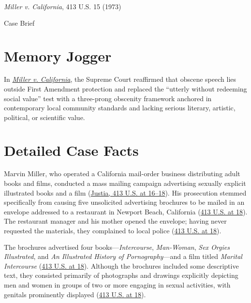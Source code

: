 \documentclass[12pt]{article}
\begin{document}
\begin{center}
{\LARGE \textit{Miller v. California}, 413 U.S. 15 (1973)\par}
\vspace{0.8em}
{\large Case Brief\par}
\end{center}
\vspace{1em}

\section{Memory Jogger}
In \href{https://www.courtlistener.com/opinion/108838/miller-v-california/}{\textit{Miller v. California}}, the Supreme Court reaffirmed that obscene speech lies outside First Amendment protection and replaced the ``utterly without redeeming social value'' test with a three-prong obscenity framework anchored in contemporary local community standards and lacking serious literary, artistic, political, or scientific value.

\section{Detailed Case Facts}
Marvin Miller, who operated a California mail-order business distributing adult books and films, conducted a mass mailing campaign advertising sexually explicit illustrated books and a film (\href{https://supreme.justia.com/cases/federal/us/413/15/}{Justia, 413 U.S. at 16--18}). His prosecution stemmed specifically from causing five unsolicited advertising brochures to be mailed in an envelope addressed to a restaurant in Newport Beach, California (\href{https://supreme.justia.com/cases/federal/us/413/15/}{413 U.S. at 18}). The restaurant manager and his mother opened the envelope; having never requested the materials, they complained to local police (\href{https://supreme.justia.com/cases/federal/us/413/15/}{413 U.S. at 18}).

The brochures advertised four books---\textit{Intercourse}, \textit{Man-Woman}, \textit{Sex Orgies Illustrated}, and \textit{An Illustrated History of Pornography}---and a film titled \textit{Marital Intercourse} (\href{https://supreme.justia.com/cases/federal/us/413/15/}{413 U.S. at 18}). Although the brochures included some descriptive text, they consisted primarily of photographs and drawings explicitly depicting men and women in groups of two or more engaging in sexual activities, with genitals prominently displayed (\href{https://supreme.justia.com/cases/federal/us/413/15/}{413 U.S. at 18}).
\end{document}
